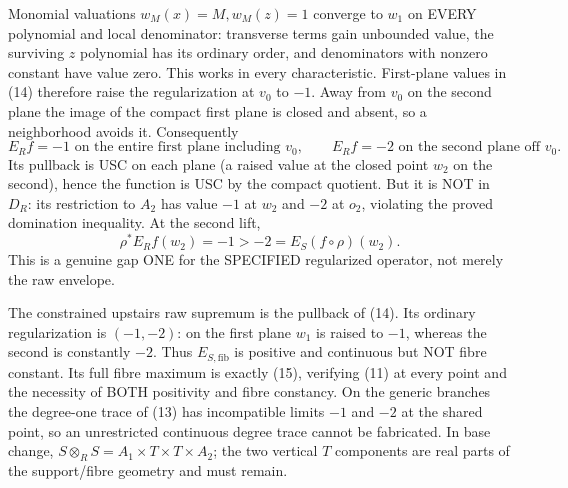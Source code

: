 Monomial valuations $w_M(x)=M,w_M(z)=1$ converge to $w_1$ on EVERY polynomial and local denominator: transverse terms gain unbounded value, the surviving $z$ polynomial has its ordinary order, and denominators with nonzero constant have value zero. This works in every characteristic. First-plane values in (14) therefore raise the regularization at $v_0$ to $-1$. Away from $v_0$ on the second plane the image of the compact first plane is closed and absent, so a neighborhood avoids it. Consequently
\[
E_R f=-1\text{ on the entire first plane including }v_0,
\qquad E_R f=-2\text{ on the second plane off }v_0.    \tag{15}
\]
Its pullback is USC on each plane (a raised value at the closed point $w_2$ on the second), hence the function is USC by the compact quotient. But it is NOT in $D_R$: its restriction to $A_2$ has value $-1$ at $w_2$ and $-2$ at $o_2$, violating the proved domination inequality. At the second lift,
\[
\rho^*E_R f(w_2)=-1>-2=E_S(f\circ\rho)(w_2).          \tag{16}
\]
This is a genuine gap ONE for the SPECIFIED regularized operator, not merely the raw envelope.

The constrained upstairs raw supremum is the pullback of (14). Its ordinary regularization is $(-1,-2)$: on the first plane $w_1$ is raised to $-1$, whereas the second is constantly $-2$. Thus $E_{S,\mathrm{fib}}$ is positive and continuous but NOT fibre constant. Its full fibre maximum is exactly (15), verifying (11) at every point and the necessity of BOTH positivity and fibre constancy. On the generic branches the degree-one trace of (13) has incompatible limits $-1$ and $-2$ at the shared point, so an unrestricted continuous degree trace cannot be fabricated. In base change,
$S\otimes_R S=A_1\times T\times T\times A_2$;
the two vertical $T$ components are real parts of the support/fibre geometry and must remain.
